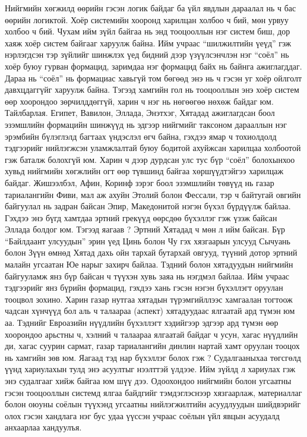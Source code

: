 Нийгмийн хөгжилд өөрийн гэсэн логик байдаг ба үйл явдлын дараалал нь ч бас өөрийн логиктой. Хоёр системийн хооронд харилцан холбоо ч бий, мөн урвуу холбоо ч бий. Чухам ийм зүйл байгаа нь энд тооцооллын нэг систем биш, дор хаяж хоёр систем байгааг харуулж байна. Ийм учраас “шилжилтийн үеүд” гэж нэрлэгдсэн тэр зүйлийг шинжлэх үед бидний дээр үзүүлсэнчлэн нэг “соёл” нь хоёр буюу гурван формацид, заримдаа нэг формацид байх нь байнга ажиглагддаг. Дараа нь “соёл” нь формациас хавьгүй том бөгөөд энэ нь ч гэсэн уг хоёр ойлголт давхцдаггүйг харуулж байна. Тэгээд хамгийн гол нь тооцооллын энэ хоёр систем өөр хоорондоо зөрчилддөггүй, харин ч нэг нь нөгөөгөө нөхөж байдаг юм.
Тайлбарлая. Египет, Вавилон, Эллада, Энэтхэг, Хятадад ажиглагдсан боол эзэмшлийн формацийн шинжүүд нь эдгээр нийгмийг таксоном дарааллын нэг эрэмбийн бүлэглэлд багтаах үндэслэл өгч байна, гэхдээ ямар ч тохиолдолд тэдгээрийг нийлэгжсэн уламжлалтай буюу бодитой ахуйжсан харилцаа холбоотой гэж баталж болохгүй юм. Харин ч дээр дурдсан улс тус бүр “соёл” болохынхоо хувьд нийгмийн хөгжлийн огт өөр түвшинд байгаа хөршүүдтэйгээ харилцаж байдаг. Жишээлбэл, Афин, Коринф зэрэг боол эзэмшлийн төвүүд нь газар тариалангийн Фиви, мал аж ахуйн Этолий болон Фессали, тэр ч байтугай овгийн байгуулал нь задран байсан Эпир, Македонитой нэгэн бүхэл бүрдүүлж байлаа. Гэхдээ энэ бүгд хамтдаа эртний грекүүд өөрсдөө бүхэллэг гэж үзэж байсан Эллада болдог юм. Тэгээд яагаав ?
Эртний Хятадад ч мөн л ийм байсан. Бүр “Байлдаант улсуудын” эрин үед Цинь болон Чу гэх хязгаарын улсууд Сычуань болон Зүүн өмнөд Хятад дахь ойн тархай бутархай овгууд, түүний дотор эртний малайн угсаатан Юе нарыг захирч байлаа. Тэдний болон хятадуудын нийгмийн байгууламж янз бүр байсан ч түүхэн хувь заяа нь нэгдмэл байлаа. Ийм учраас тэдгээрийг янз бүрийн формацид, гэхдээ хань гэсэн нэгэн бүхэллэгт оруулан тооцвол зохино. Харин газар нутгаа хятадын түрэмгийллээс хамгаалан тогтоож чадсан хүнчүүд бол аль ч талаараа (аспект) хятадуудаас ялгаатай ард түмэн юм аа. Тэднийг Евроазийн нүүдлийн бүхэллэгт хэдийгээр эдгээр ард түмэн өөр хоорондоо арьстны ч, хэлний ч талаараа ялгаатай байдаг ч усун, хагас нүүдлийн ди, хагас суурин сармат, газар тариалангийн динлин нартай хамт оруулан тооцох нь хамгийн зөв юм. Яагаад тэд нар бүхэллэг болох гэж ?
Судалгааныхаа төгсгөлд үүнд хариулахын тулд энэ асуултыг нээлттэй үлдээе. Ийм зүйлд л хариулах гэж энэ судалгааг хийж байгаа юм шүү дээ. Одоохондоо нийгмийн болон угсаатны гэсэн тооцооллын системд ялгаа байдгийг тэмдэглэснээр хязгаарлаж, материаллаг болон оюуны соёлын түүхэнд угсаатны нийлэгжилтийн асуудлуудын шийдвэрийг олох гэсэн хандлага нэг бус удаа үүссэн учраас соёлын үйл явцын асуудалд анхаарлаа хандуулъя.
